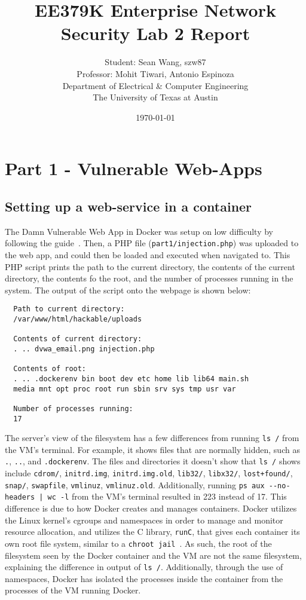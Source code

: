 \documentclass[11pt]{article}
\author{Student: Sean Wang, szw87 \\ Professor: Mohit Tiwari, Antonio Espinoza \\ Department of Electrical \& Computer Engineering \\ The University of Texas at Austin}
\date{\today}
\title{EE379K Enterprise Network Security Lab 2 Report}
\begin{document}
\maketitle
\section*{Part 1 - Vulnerable Web-Apps}
\subsection*{Setting up a web-service in a container}
The Damn Vulnerable Web App in Docker was setup on low difficulty by following the guide~\cite{dvwa}. Then, a
PHP file (\verb|part1/injection.php|) was uploaded to the web app, and could then be loaded and executed when navigated to. This PHP script
prints the path to the current directory, the contents of the current directory, the contents fo the root, and the number of processes
running in the system. The output of the script onto the webpage is shown below:
\begin{verbatim}
  Path to current directory:
  /var/www/html/hackable/uploads
  
  Contents of current directory:
  . .. dvwa_email.png injection.php
  
  Contents of root:
  . .. .dockerenv bin boot dev etc home lib lib64 main.sh
  media mnt opt proc root run sbin srv sys tmp usr var
  
  Number of processes running:
  17
\end{verbatim}
The server's view of the filesystem has a few differences from running \verb|ls /| from the VM's terminal. For example, it shows files
that are normally hidden, such as \verb|.|, \verb|..|, and \verb|.dockerenv|. The files and directories it doesn't show that
\verb|ls /| shows include \verb|cdrom/|, \verb|initrd.img|, \verb|initrd.img.old|, \verb|lib32/|, \verb|libx32/|, \verb|lost+found/|,
\verb|snap/|, \verb|swapfile|, \verb|vmlinuz|, \verb|vmlinuz.old|. Additionally, running \verb=ps aux --no-headers | wc -l= from the
VM's terminal resulted in 223 instead of 17. This difference is due to how Docker creates and manages containers. Docker utilizes the
Linux kernel's cgroups and namespaces in order to manage and monitor resource allocation, and utilizes the C library, \verb|runC|,
that gives each container its own root file system, similar to a \verb|chroot jail|~\cite{codementor,demystify}. As such, the root of
the filesystem seen by the Docker container and the VM are not the same filesystem, explaining the difference in output of \verb|ls /|.
Additionally, through the use of namespaces, Docker has isolated the processes inside the container from the processes of the VM
running Docker.



\end{document}
